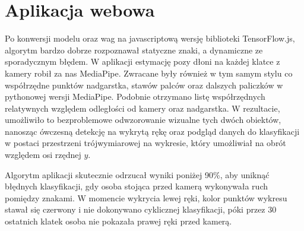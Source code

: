 \section{Aplikacja webowa}
\label{sec:web-application}

Po konwersji modelu oraz wag na javascriptową wersję biblioteki TensorFlow.js, algorytm bardzo dobrze rozpoznawał statyczne znaki, a dynamiczne ze sporadycznym błędem. W aplikacji estymację pozy dłoni na każdej klatce z kamery robił za nas MediaPipe. Zwracane były również w tym samym stylu co współrzędne punktów nadgarstka, stawów palców oraz dalszych paliczków w pythonowej wersji MediaPipe. Podobnie otrzymano listę współrzędnych relatywnych względem odległości od kamery oraz nadgarstka. W rezultacie, umożliwiło to bezproblemowe odwzorowanie wizualne tych dwóch obiektów, nanosząc ówczesną detekcję na wykrytą rękę oraz podgląd danych do klasyfikacji w postaci przestrzeni trójwymiarowej na wykresie, który umożliwiał na obrót względem osi rzędnej $y$.

Algorytm aplikacji skutecznie odrzucał wyniki poniżej 90\%, aby uniknąć błędnych klasyfikacji, gdy osoba stojąca przed kamerą wykonywała ruch pomiędzy znakami. W momencie wykrycia lewej ręki, kolor punktów wykresu stawał się czerwony i nie dokonywano cyklicznej klasyfikacji, póki przez 30 ostatnich klatek osoba nie pokazała prawej ręki przed kamerą.

